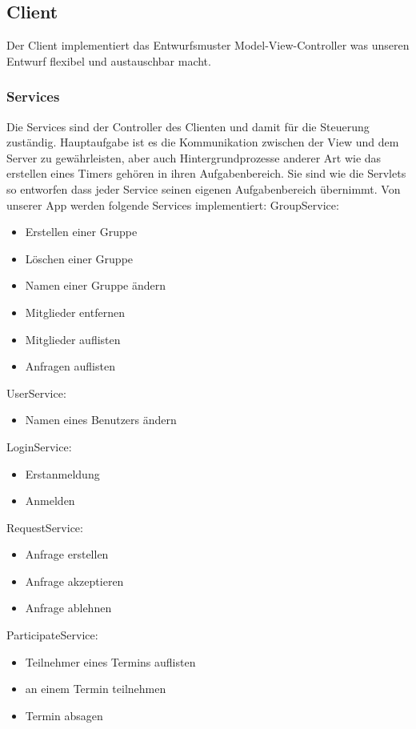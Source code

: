 \documentclass{scrartcl}
\begin{document}
	\subsection{Client}
	Der Client implementiert das Entwurfsmuster Model-View-Controller was unseren Entwurf flexibel und austauschbar macht.
	\subsubsection{Services}
	Die Services sind der Controller des Clienten und damit für die Steuerung zuständig. Hauptaufgabe ist es die Kommunikation zwischen der View und dem Server zu gewährleisten, aber auch Hintergrundprozesse anderer Art wie das erstellen eines Timers gehören in ihren Aufgabenbereich.
Sie sind wie die Servlets so entworfen dass jeder Service seinen eigenen Aufgabenbereich übernimmt.
Von unserer App werden folgende Services implementiert:
\newline
GroupService:
\begin{itemize}
\item Erstellen einer Gruppe
\item Löschen einer Gruppe
\item Namen einer Gruppe ändern
\item Mitglieder entfernen
\item Mitglieder auflisten
\item Anfragen auflisten
\end{itemize}
UserService:
\begin{itemize}
\item Namen eines Benutzers ändern
\end{itemize}
LoginService:
\begin{itemize}
\item Erstanmeldung
\item Anmelden
\end{itemize}
RequestService:
\begin{itemize}
\item Anfrage erstellen
\item Anfrage akzeptieren
\item Anfrage ablehnen
\end{itemize}
ParticipateService:
\begin{itemize}
\item Teilnehmer eines Termins auflisten
\item an einem Termin teilnehmen
\item Termin absagen
\end{itemize}
\end{document}
